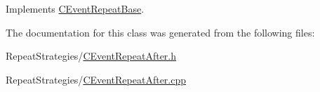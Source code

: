 Implements \mbox{\hyperlink{class_c_event_repeat_base_acf60d2b0890fdb3e701c944b26186197}{C\+Event\+Repeat\+Base}}.



The documentation for this class was generated from the following files\+:\begin{DoxyCompactItemize}
\item 
Repeat\+Strategies/\mbox{\hyperlink{_c_event_repeat_after_8h}{C\+Event\+Repeat\+After.\+h}}\item 
Repeat\+Strategies/\mbox{\hyperlink{_c_event_repeat_after_8cpp}{C\+Event\+Repeat\+After.\+cpp}}\end{DoxyCompactItemize}
